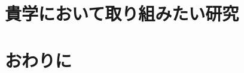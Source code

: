 \documentclass[twocolumn]{jarticle}%
\begin{document}
\section{貴学において取り組みたい研究}\label{want}

\section{おわりに}



\end{document}
